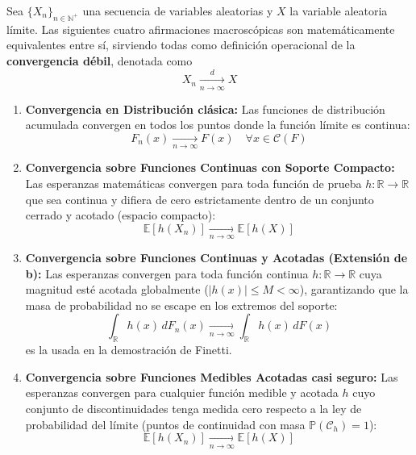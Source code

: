 \noindent
Sea $\{X_n\}_{n \in \mathbb{N}^+}$ una secuencia de variables aleatorias y $X$ la variable aleatoria límite. Las siguientes cuatro afirmaciones macroscópicas son matemáticamente equivalentes entre sí, sirviendo todas como definición operacional de la \textbf{convergencia débil}, denotada como 
$$X_n \xrightarrow[n \to \infty]{d} X$$

\begin{enumerate}
    \item[\textbf{a)}] \textbf{Convergencia en Distribución clásica:}
    Las funciones de distribución acumulada convergen en todos los puntos donde la función límite es continua:
    \begin{equation*}
        F_n(x) \xrightarrow[n \to \infty]{} F(x) \quad \forall x \in \mathcal{C}(F)
    \end{equation*}

    \item[\textbf{b)}] \textbf{Convergencia sobre Funciones Continuas con Soporte Compacto:}
    Las esperanzas matemáticas convergen para toda función de prueba $h: \mathbb{R} \rightarrow \mathbb{R}$ que sea continua y difiera de cero estrictamente dentro de un conjunto cerrado y acotado (espacio compacto):
    \begin{equation*}
        \mathbb{E}[h(X_n)] \xrightarrow[n \to \infty]{} \mathbb{E}[h(X)]
    \end{equation*}

    \item[\textbf{c)}] \textbf{Convergencia sobre Funciones Continuas y Acotadas (Extensión de b):}
    Las esperanzas convergen para toda función continua $h: \mathbb{R} \rightarrow \mathbb{R}$ cuya magnitud esté acotada globalmente ($|h(x)| \leq M < \infty$), garantizando que la masa de probabilidad no se escape en los extremos del soporte:
    \begin{equation*}
        \int_{\mathbb{R}} h(x) \, dF_n(x) \xrightarrow[n \to \infty]{} \int_{\mathbb{R}} h(x) \, dF(x)
    \end{equation*}
    es la usada en la demostración de Finetti.

    \item[\textbf{d)}] \textbf{Convergencia sobre Funciones Medibles Acotadas casi seguro:}
    Las esperanzas convergen para cualquier función medible y acotada $h$ cuyo conjunto de discontinuidades tenga medida cero respecto a la ley de probabilidad del límite (puntos de continuidad con masa $\mathbb{P}(\mathcal{C}_h) = 1$):
    \begin{equation*}
        \mathbb{E}[h(X_n)] \xrightarrow[n \to \infty]{} \mathbb{E}[h(X)]
    \end{equation*}
\end{enumerate}

